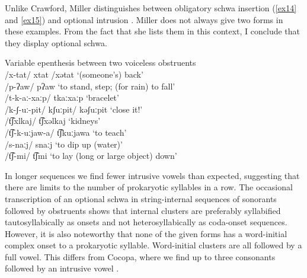 \documentclass[output=paper,colorlinks,citecolor=brown]{langscibook}
\begin{document}
Unlike Crawford, Miller distinguishes between obligatory schwa insertion (\ref{ex14} and \ref{ex15}) and optional intrusion . Miller does not always give two forms in these examples. From the fact that she lists them in this context, I conclude that they display optional schwa.

\begin{exe}
    \ex \label{ex16} Variable epenthesis between two voiceless obstruents\\
    /x-tat/    \tab    xtat /xətat      \tab     ‘(someone's) back’\\
    /p-ʔaw/  \tab        pʔaw     \tab           ‘to stand, step; (for rain) to fall’\\
    /t-k-aː-xaːp/  \tab    tkaːxaːp  \tab           ‘bracelet’\\
    /k-ʃ{}-uː-pit/    \tab   kʃuːpit/ kəʃuːpit \tab      ‘close it!’\\
    /t͡ʃxlkaj/   \tab      t͡ʃxəlkaj   \tab           ‘kidneys’\\
    /t͡ʃ-k-uːjaw-a/  \tab   t͡ʃkuːjawa    \tab        ‘to teach’\\
    /s-naːj/   \tab      snaːj      \tab         ‘to dip up (water)’\\
    /t͡ʃ-mi/   \tab      t͡ʃmi         \tab      ‘to lay (long or large object) down’
\end{exe}

In longer sequences we find fewer intrusive vowels than expected, suggesting that there are limits to the number of prokaryotic syllables in a row. The occasional transcription of an optional schwa in string-internal sequences of sonorants followed by obstruents shows that internal clusters are preferably syllabified tautosyllabically as onsets and not heterosyllabically as coda-onset sequences. However, it is also noteworthy that none of the given forms has a word-initial complex onset to a prokaryotic syllable. Word-initial clusters are all followed by a full vowel. This differs from Cocopa, where we find up to three consonants followed by an intrusive vowel .
\end{document}
